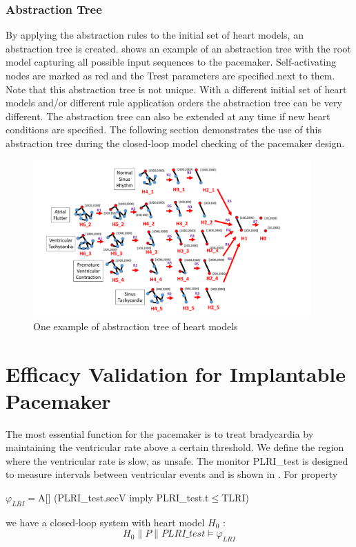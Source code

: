 \subsubsection{Abstraction Tree}
By applying the abstraction rules to the initial set of heart models, an abstraction tree is created.
 shows an example of an abstraction tree with the root model capturing all possible input sequences to the pacemaker.
Self-activating nodes are marked as red and the Trest parameters are specified next to them.
Note that this abstraction tree is not unique.
With a different initial set of heart models and/or different rule application orders the abstraction tree can be very different.
The abstraction tree can also be extended at any time if new heart conditions are specified.
The following section demonstrates the use of this abstraction tree during the closed-loop model checking of the pacemaker design.

 \begin{figure}[!t]
	\centering
	\includegraphics[width=0.95\textwidth]{figs/abs_tree.pdf}
	\caption{\small One example of abstraction tree of heart models}
	\label{fig:HM_abs}
\end{figure}


\section{Efficacy Validation for Implantable Pacemaker}
The most essential function for the pacemaker is to treat bradycardia by maintaining the ventricular rate above a certain threshold. We define the region where the ventricular rate is slow, as \textsf{unsafe}. The monitor \textsf{PLRI\_test} is designed to measure intervals between ventricular events and is shown in . For property
\begin{center}
\textsf{$\varphi_{LRI}=$A[] (PLRI\_test.secV imply PLRI\_test.t$\leq$TLRI)}
\end{center}
we have a closed-loop system with heart model $H_0$ : 
$$H_0\| P\| PLRI\_test\models\varphi_{LRI}$$

